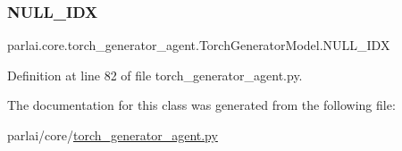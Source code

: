 \subsubsection{\texorpdfstring{N\+U\+L\+L\+\_\+\+I\+DX}{NULL\_IDX}}
{\footnotesize\ttfamily parlai.\+core.\+torch\+\_\+generator\+\_\+agent.\+Torch\+Generator\+Model.\+N\+U\+L\+L\+\_\+\+I\+DX}



Definition at line 82 of file torch\+\_\+generator\+\_\+agent.\+py.



The documentation for this class was generated from the following file\+:\begin{DoxyCompactItemize}
\item 
parlai/core/\hyperlink{torch__generator__agent_8py}{torch\+\_\+generator\+\_\+agent.\+py}\end{DoxyCompactItemize}
